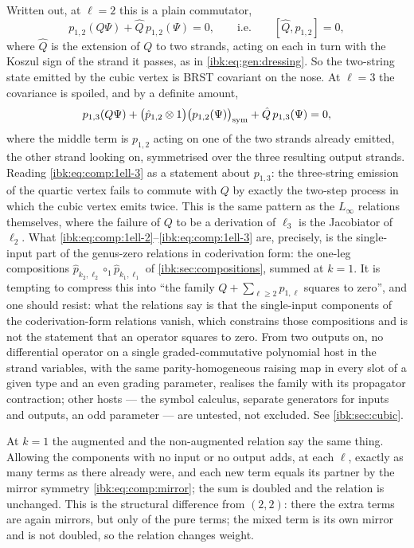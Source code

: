 Written out, at $\ell=2$ this is a plain commutator,
\begin{equation}
  \label{ibk:eq:comp:1ell-2}
  p_{1,2}(Q\Psi)+\hat Q\,p_{1,2}(\Psi)
    = 0,
  \qquad\text{i.e.}\qquad
  [\hat Q,p_{1,2}]
    = 0,
\end{equation}
where $\hat Q$ is the extension of $Q$ to two strands, acting on each in turn with the Koszul sign of the strand it passes, as in \eqref{ibk:eq:gen:dressing}. So the two-string state emitted by the cubic vertex is BRST covariant on the nose. At $\ell=3$ the covariance is spoiled, and by a definite amount,
\begin{equation}
  \label{ibk:eq:comp:1ell-3}
  p_{1,3}(Q\Psi)
    + \bigl(\hat p_{1,2}\otimes1\bigr)\bigl(p_{1,2}(\Psi)\bigr)_{\rm sym}
    + \hat Q\,p_{1,3}(\Psi)
    = 0,
\end{equation}
where the middle term is $p_{1,2}$ acting on one of the two strands already emitted, the other strand looking on, symmetrised over the three resulting output strands. Reading \eqref{ibk:eq:comp:1ell-3} as a statement about $p_{1,3}$: the three-string emission of the quartic vertex fails to commute with $Q$ by exactly the two-step process in which the cubic vertex emits twice. This is the same pattern as the $L_\infty$ relations themselves, where the failure of $Q$ to be a derivation of $\ell_3$ is the Jacobiator of $\ell_2$. What \eqref{ibk:eq:comp:1ell-2}--\eqref{ibk:eq:comp:1ell-3} are, precisely, is the single-input part of the genus-zero relations in coderivation form: the one-leg compositions $\hat p_{k_2,\ell_2}\circ_1\hat p_{k_1,\ell_1}$ of \cref{ibk:sec:compositions}, summed at $k=1$. It is tempting to compress this into \enquote{the family $Q+\sum_{\ell\ge2}p_{1,\ell}$ squares to zero}, and one should resist: what the relations say is that the single-input components of the coderivation-form relations vanish, which constrains those compositions and is not the statement that an operator squares to zero. From two outputs on, no differential operator on a single graded-commutative polynomial host in the strand variables, with the same parity-homogeneous raising map in every slot of a given type and an even grading parameter, realises the family with its propagator contraction; other hosts --- the symbol calculus, separate generators for inputs and outputs, an odd parameter --- are untested, not excluded. See \cref{ibk:sec:cubic}.

At $k=1$ the augmented and the non-augmented relation say the same thing. Allowing the components with no input or no output adds, at each $\ell$, exactly as many terms as there already were, and each new term equals its partner by the mirror symmetry \eqref{ibk:eq:comp:mirror}; the sum is doubled and the relation is unchanged. This is the structural difference from $(2,2)$: there the extra terms are again mirrors, but only of the pure terms; the mixed term is its own mirror and is not doubled, so the relation changes weight.


